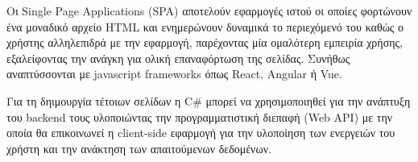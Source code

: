Οι Single Page Applications (SPA) αποτελούν εφαρμογές ιστού οι οποίες φορτώνουν ένα μοναδικό αρχείο HTML
και ενημερώνουν δυναμικά το περιεχόμενό του καθώς ο χρήστης αλληλεπιδρά με την εφαρμογή, παρέχοντας
μία ομαλότερη εμπειρία χρήσης, εξαλείφοντας την ανάγκη για ολική επαναφόρτωση της σελίδας. Συνήθως αναπτύσσονται
με javascript frameworks όπως React, Angular ή Vue.

Για τη δηιμουργία τέτοιων σελίδων η C\# μπορεί να χρησιμοποιηθεί για την ανάπτυξη του backend τους υλοποιώντας
την προγραμματιστική διεπαφή (Web API) με την οποία θα επικοινωνεί η client-side εφαρμογή για την υλοποίηση
των ενεργειών του χρήστη και την ανάκτηση των απαιτούμενων δεδομένων.